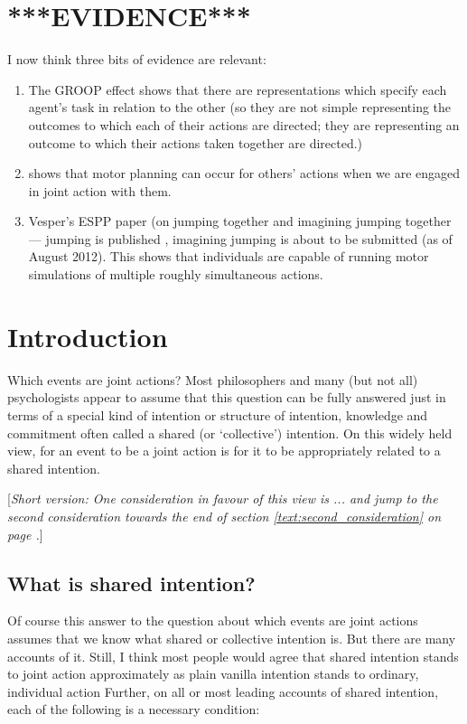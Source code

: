\documentclass[12pt,\papersize]{extarticle}
\begin{document}
\section{***EVIDENCE***}
I now think three bits of evidence are relevant:
\begin{enumerate}
\item The GROOP effect shows that there are representations which specify each agent's task in relation to the other (so they are not simple representing the outcomes to which each of their actions are directed; they are representing an outcome to which their actions taken together are directed.)
\item \citet{kourtis:2012_predictive} shows that motor planning can occur for others' actions when we are engaged in joint action with them.
\item Vesper's ESPP paper (on jumping together and imagining jumping together --- jumping is published \citep{vesper:2012_jumping}, imagining jumping is about to be submitted (as of August 2012).  This shows that individuals are capable of running motor simulations of multiple roughly simultaneous actions.
\end{enumerate}


\section{Introduction}
Which events are joint actions?
Most philosophers and many (but not all) psychologists appear to assume that this question can be fully answered just in terms of a special kind of intention or structure of intention, knowledge and commitment often called a shared (or `collective') intention.
On this widely held view, for an event to be a joint action is for it to be appropriately related to a shared intention.

[\textit{Short version: One consideration in favour of this view is ... and jump to the second consideration towards the end of  section \ref{text:second_consideration} on page .}]

\subsection{What is shared intention?}
Of course this answer to the question about which events are joint actions assumes that we know what shared or collective intention is.
But there are many accounts of it.
Still, I think most people would agree that shared intention stands to joint action approximately as plain vanilla intention stands to ordinary, individual action
Further,
on all or most leading accounts of shared intention, each of the following is a necessary condition:
\end{document}
